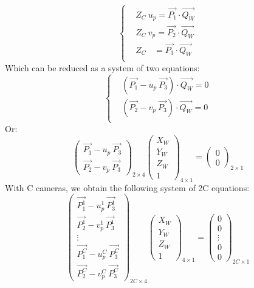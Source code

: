 \begin{equation}
  \begin{cases}
    & Z_C \ u_p = \overrightarrow{P_1} \cdot \overrightarrow{Q_W}\\
    & Z_C \ v_p = \overrightarrow{P_2} \cdot \overrightarrow{Q_W}\\
    & Z_C \ \ \ \ = \overrightarrow{P_3} \cdot \overrightarrow{Q_W}\\
  \end{cases}
\end{equation}
Which can be reduced as a system of two equations:
\begin{equation}\label{eq:factortrig}
  \begin{cases}
    &  (\overrightarrow{P_1} - u_p \ \overrightarrow{P_3} ) \cdot \overrightarrow{Q_W}  = 0\\
    &  (\overrightarrow{P_2} - v_p \ \overrightarrow{P_3} ) \cdot \overrightarrow{Q_W}  = 0\\
  \end{cases}
\end{equation}
Or:
\begin{equation}
  \begin{pmatrix}
      \overrightarrow{P_1} - u_p \ \overrightarrow{P_3}\\
      \overrightarrow{P_2} - v_p \ \overrightarrow{P_3}
    \end{pmatrix}_{\!\!2\times 4}
    \begin{pmatrix} X_W \\ Y_W \\ Z_W\\1 \end{pmatrix}_{\!\!4\times 1}
  = \begin{pmatrix} 0 \\0 \end{pmatrix}_{\!\!2\times 1}
\end{equation}
With C cameras, we obtain the following system of 2C equations:
\begin{equation}
\begin{pmatrix}
      \overrightarrow{P_1^1} - u_p^1 \ \overrightarrow{P_3^1}\\
      \overrightarrow{P_2^1} - v_p^1 \ \overrightarrow{P_3^1} \\ 
      \vdots \\
      \overrightarrow{P_1^C} - u_p^C \ \overrightarrow{P_3^C}\\
      \overrightarrow{P_2^C} - v_p^C \ \overrightarrow{P_3^C}
\end{pmatrix}_{\!\!2C\times 4}
\begin{pmatrix} X_W \\ Y_W \\ Z_W\\1 \end{pmatrix}_{\!\!4\times 1}
= \begin{pmatrix} 0 \\ 0 \\ \vdots \\ 0 \\ 0 \end{pmatrix}_{\!\!2C\times 1}
\end{equation}
